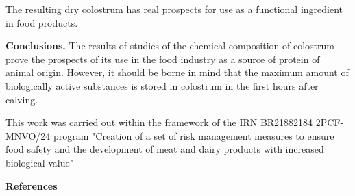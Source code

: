 \begin{multicols}{2}
The resulting dry colostrum has real prospects for use as a functional
ingredient in food products.

{\bfseries Conclusions.} The results of studies of the chemical composition
of colostrum prove the prospects of its use in the food industry as a
source of protein of animal origin. However, it should be borne in mind
that the maximum amount of biologically active substances is stored in
colostrum in the first hours after calving.

This work was carried out within the framework of the IRN BR21882184
2PCF-MNVO/24 program "Creation of a set of risk management measures to
ensure food safety and the development of meat and dairy products with
increased biological value"
\end{multicols}

\begin{center}
{\bfseries References}
\end{center}

